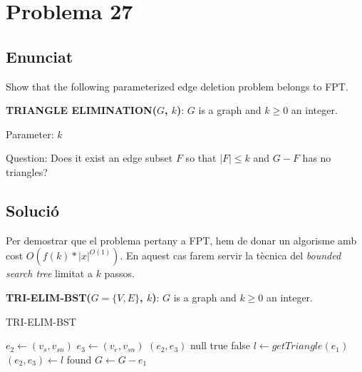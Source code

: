 \section{Problema 27}
\subsection{Enunciat}
Show that the following parameterized edge deletion problem belongs to FPT.
\par
\textbf{TRIANGLE ELIMINATION($G$, $k$)}: $G$ is a graph and $k\geq0$ an integer.
\par
Parameter: $k$
\par
Question: Does it exist an edge subset $F$ so that $|F| \leq k$ and $G-F$ has no triangles?

\subsection{Solució}
Per demostrar que el problema pertany a FPT, hem de donar un algorisme amb cost $O(f(k)*|x|^{O(1)})$.
En aquest cas farem servir la tècnica del \textit{bounded search tree} limitat a $k$ passos.
\par
\textbf{TRI-ELIM-BST($G=\{V,E\}$, $k$)}: $G$ is a graph and $k\geq0$ an integer.


\begin{algorithm}
\caption{TRI-ELIM-BST}\label{euclid}
\begin{algorithmic}[1]
 
            \State $e_2 \gets (v_s, v_{sn})$
            \State $e_3 \gets (v_e, v_{sn})$
            \State \Return $(e_2, e_3)$
        \EndIf
    \EndFor
\EndFor
\State \Return null
\EndFunction
\newline
{}
    \State \Return true
\EndIf
{}
    \State \Return false
\EndIf
{}
    \State $l \gets getTriangle(e_1)$
        \State $(e_2, e_3) \gets l$
        \State \Return found
    \Else
        \State $G \gets G - e_1$
    \EndIf
\EndFor
\State {} 
\EndFunction
\end{algorithmic}
\end{algorithm}

